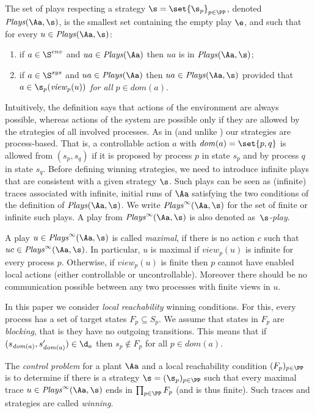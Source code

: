 \documentclass{llncs}
\newcommand{\loc}{\mathit{dom}}
\newcommand{\Plays}{\mathit{Plays}}
\newcommand{\view}{\mathit{view}}
\newcommand{\Ssys}{\S^{sys}}
\newcommand{\Senv}{\S^{env}}
\begin{document}
The set of plays respecting a strategy $\s=\set{\s_p}_{p\in
  \PP}$, denoted $\Plays(\Aa,\s)$,  is the smallest set  
containing the empty play $\e$, and such that for every $u\in \Plays(\Aa,\s)$:
\begin{enumerate}
\item if $a\in \Senv$ and $u a \in \Plays(\Aa)$ then $u a$ is in
  $\Plays(\Aa,\s)$;
\item if $a\in \Ssys$ and $u a\in \Plays(\Aa)$ then $u
  a\in\Plays(\Aa,\s)$ provided that $a\in \s_p(\view_p(u))$ \emph{for all}
  $p\in\loc (a)$.
\end{enumerate}
Intuitively, the definition says that actions of the environment are
always possible, whereas actions of the system are possible only if
they are allowed by the strategies of all involved processes.
As in \cite{MTY05} (and unlike \cite{GLZ04}) our strategies
are process-based. That is, a controllable action $a$ with
$\loc(a)=\set{p,q}$ is allowed from $(s_p,s_q)$ if it is proposed by
process $p$ in state $s_p$ and by process $q$ in state $s_q$.
Before
defining winning strategies, we need to introduce infinite plays that
are consistent with a given strategy $\s$. Such plays can be seen as
(infinite) traces associated with infinite, initial runs of $\Aa$
satisfying the two conditions of the definition of
$\Plays(\Aa,\s)$. We write $\Plays^\infty(\Aa,\s)$ for the set of
finite or infinite such plays.  A play from $\Plays^\infty(\Aa,\s)$ is
also denoted as~\emph{$\s$-play}.


A play $u \in \Plays^\infty(\Aa,\s)$ is called
\emph{maximal}, if there is no action $c$ such that
$uc\in \Plays^\infty(\Aa,\s)$.  In particular, $u$ is maximal if
$\view_p(u)$ is infinite for every process $p$. Otherwise, if
$\view_p(u)$ is finite then $p$ cannot have enabled local actions
(either controllable or uncontrollable). Moreover there should be no
communication possible between any two processes with finite views in
$u$.


In this paper we consider \emph{local reachability} winning
conditions. For this, every process has a set of target states $F_p
\subseteq S_p$. We assume that states in $F_p$ are \emph{blocking},
that is they have no outgoing transitions. This means that if
$(s_{\loc(a)},s'_{\loc(a)}) \in \d_a$ then $s_p \notin F_p$ for all $p
\in \loc(a)$. 

\begin{definition}
The \emph{control problem} for a plant $\Aa$ and a local reachability
condition $(F_p)_{p \in \PP}$ is to determine if there is a strategy
$\s=(\s_p)_{p \in \PP}$ such that every maximal trace $u \in
\Plays^\infty(\Aa,\s)$ ends 
in $\prod_{p \in \PP} F_p$ (and is thus finite).  Such traces and
strategies are called \emph{winning}.
\end{definition}
\end{document}
